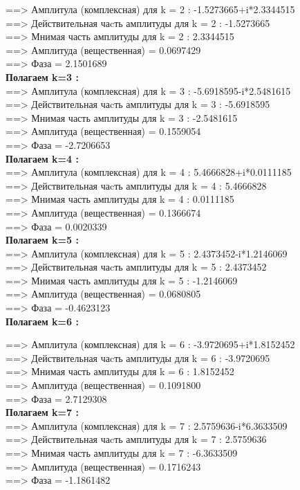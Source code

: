 \documentclass[a4paper,11pt]{article}
\begin{document}
\begin{flushleft}
 ==> Амплитула (комплексная) для k = 2 : -1.5273665+i*2.3344515\\ 
 ==> Действительная чаcть амплитуды  для k = 2 : -1.5273665\\ 
 ==> Мнимая часть амплитуды  для k = 2 : 2.3344515\\ 
 ==> Амплитуда (вещественная) = 0.0697429\\ 
 ==> Фаза = 2.1501689\\ 
\textbf{Полагаем k=3 :\\ }
 ==> Амплитула (комплексная) для k = 3 : -5.6918595-i*2.5481615 \\ 
 ==> Действительная чаcть амплитуды  для k = 3 : -5.6918595 \\ 
 ==> Мнимая часть амплитуды  для k = 3 : -2.5481615\\ 
 ==> Амплитуда (вещественная) = 0.1559054\\ 
 ==> Фаза = -2.7206653\\  
\textbf{Полагаем k=4 :\\ }
 ==> Амплитула (комплексная) для k = 4 :  5.4666828+i*0.0111185\\ 
 ==> Действительная чаcть амплитуды  для k = 4 : 5.4666828\\ 
 ==> Мнимая часть амплитуды  для k = 4 : 0.0111185\\ 
 ==> Амплитуда (вещественная) = 0.1366674\\ 
 ==> Фаза = 0.0020339\\ 
\textbf{Полагаем k=5 :\\} 
 ==> Амплитула (комплексная) для k = 5 :  2.4373452-i*1.2146069\\ 
 ==> Действительная чаcть амплитуды  для k = 5 : 2.4373452\\ 
 ==> Мнимая часть амплитуды  для k = 5 : -1.2146069\\ 
 ==> Амплитуда (вещественная) = 0.0680805\\ 
 ==> Фаза = -0.4623123\\ 

\textbf{Полагаем k=6 :\\ }
 
 ==> Амплитула (комплексная) для k = 6 : -3.9720695+i*1.8152452\\ 
 ==> Действительная чаcть амплитуды для k = 6 : -3.9720695\\ 
 ==> Мнимая часть амплитуды  для k = 6 : 1.8152452\\ 
 ==> Амплитуда (вещественная) = 0.1091800\\ 
 ==> Фаза = 2.7129308\\ 
\textbf{Полагаем k=7 :\\} 
 ==> Амплитула (комплексная) для k = 7 :  2.5759636-i*6.3633509\\ 
 ==> Действительная чаcть амплитуды  для k = 7 : 2.5759636\\ 
 ==> Мнимая часть амплитуды  для k = 7 : -6.3633509\\ 
 ==> Амплитуда (вещественная) = 0.1716243\\ 
 ==> Фаза = -1.1861482\\ 


\end{flushleft}
\end{document}
